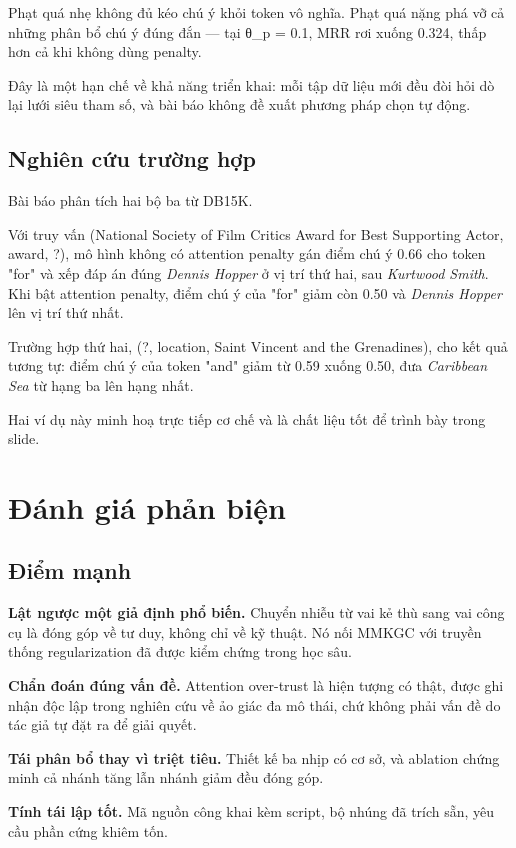 \documentclass[11pt,a4paper]{article}
\newcommand{\code}[1]{{\ttfamily\small\color{codetext}#1}}
\begin{document}
Phạt quá nhẹ không đủ kéo chú ý khỏi token vô nghĩa. Phạt quá nặng phá vỡ cả những phân bổ chú ý đúng đắn --- tại \code{θ\_p = 0.1}, MRR rơi xuống 0.324, thấp hơn cả khi không dùng penalty.

Đây là một hạn chế về khả năng triển khai: mỗi tập dữ liệu mới đều đòi hỏi dò lại lưới siêu tham số, và bài báo không đề xuất phương pháp chọn tự động.

\subsection{Nghiên cứu trường hợp}
Bài báo phân tích hai bộ ba từ DB15K.

Với truy vấn \code{(National Society of Film Critics Award for Best Supporting Actor, award, ?)}, mô hình không có attention penalty gán điểm chú ý 0.66 cho token "for" và xếp đáp án đúng \emph{Dennis Hopper} ở vị trí thứ hai, sau \emph{Kurtwood Smith}. Khi bật attention penalty, điểm chú ý của "for" giảm còn 0.50 và \emph{Dennis Hopper} lên vị trí thứ nhất.

Trường hợp thứ hai, \code{(?, location, Saint Vincent and the Grenadines)}, cho kết quả tương tự: điểm chú ý của token "and" giảm từ 0.59 xuống 0.50, đưa \emph{Caribbean Sea} từ hạng ba lên hạng nhất.

Hai ví dụ này minh hoạ trực tiếp cơ chế và là chất liệu tốt để trình bày trong slide.

\section{Đánh giá phản biện}
\subsection{Điểm mạnh}
\textbf{Lật ngược một giả định phổ biến.} Chuyển nhiễu từ vai kẻ thù sang vai công cụ là đóng góp về tư duy, không chỉ về kỹ thuật. Nó nối MMKGC với truyền thống regularization đã được kiểm chứng trong học sâu.

\textbf{Chẩn đoán đúng vấn đề.} Attention over-trust là hiện tượng có thật, được ghi nhận độc lập trong nghiên cứu về ảo giác đa mô thái, chứ không phải vấn đề do tác giả tự đặt ra để giải quyết.

\textbf{Tái phân bổ thay vì triệt tiêu.} Thiết kế ba nhịp có cơ sở, và ablation chứng minh cả nhánh tăng lẫn nhánh giảm đều đóng góp.

\textbf{Tính tái lập tốt.} Mã nguồn công khai kèm script, bộ nhúng đã trích sẵn, yêu cầu phần cứng khiêm tốn.
\end{document}
